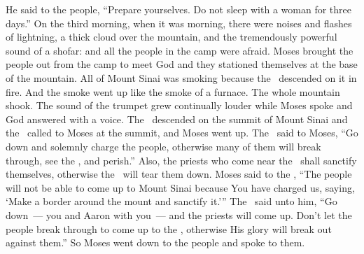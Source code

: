 \begin{inparaenum}
   He said to the people, ``Prepare yourselves. Do not sleep with a woman for three days.''%
   On the third morning, when it was morning, there were noises and flashes of lightning, a thick cloud over the mountain, and the tremendously powerful sound of a shofar: and all the people in the camp were afraid.%
   Moses brought the people out from the camp to meet God and they stationed themselves at the base of the mountain.%
   All of Mount Sinai was smoking because the \lord\ descended on it in fire. And the smoke went up like the smoke of a furnace. The whole mountain shook.%
   The sound of the trumpet grew continually louder while Moses spoke and God answered with a voice.%
   The \lord\ descended on the summit of Mount Sinai and the \lord\ called to Moses at the summit, and Moses went up.%
   The \lord\ said to Moses, ``Go down and solemnly charge the people, otherwise many of them will break through, see the \lord, and perish.''%
   Also, the priests who come near the \lord\ shall sanctify themselves, otherwise the \lord\ will tear them down.%
   Moses said to the \lord, ``The people will not be able to come up to Mount Sinai because You have charged us, saying, `Make a border around the mount and sanctify it.'\thinspace''%
   The \lord\ said unto him, ``Go down~--- you and Aaron with you~--- and the priests will come up. Don't let the people break through to come up to the \lord, otherwise His glory will break out against them.''%
   So Moses went down to the people and spoke to them.%
\end{inparaenum}

